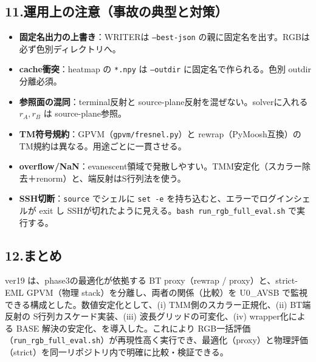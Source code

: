 \documentclass[a4paper,11pt]{jsarticle} %
\begin{document}
\subsection*{11.\;運用上の注意（事故の典型と対策）}
\begin{itemize}
\item \textbf{固定名出力の上書き}：WRITERは \texttt{--best-json} の親に固定名を出す。RGBは必ず色別ディレクトリへ。
\item \textbf{cache衝突}：heatmap の \texttt{*.npy} は \texttt{--outdir} に固定名で作られる。色別 outdir 分離必須。
\item \textbf{参照面の混同}：terminal反射と source-plane反射を混ぜない。solverに入れる $r_A,r_B$ は source-plane参照。
\item \textbf{TM符号規約}：GPVM（\texttt{gpvm/fresnel.py}）と rewrap（PyMoosh互換）のTM規約は異なる。用途ごとに一貫させる。
\item \textbf{overflow/NaN}：evanescent領域で発散しやすい。TMM安定化（スカラー除去＋renorm）と、端反射はS行列法を使う。
\item \textbf{SSH切断}：\texttt{source} でシェルに \texttt{set -e} を持ち込むと、エラーでログインシェルが exit し SSHが切れたように見える。\texttt{bash run\_rgb\_full\_eval.sh} で実行する。
\end{itemize}

\subsection*{12.\;まとめ}
ver19 は、phase3の最適化が依拠する BT proxy（rewrap / proxy）と、strict-EML GPVM（物理 stack）を分離し、両者の関係（比較）を U0\_AVSB で監視できる構成とした。数値安定化として、(i) TMM側のスカラー正規化、(ii) BT端反射の S行列カスケード実装、(iii) 波長グリッドの可変化、(iv) wrapper化による BASE 解決の安定化、を導入した。これにより RGB一括評価（\texttt{run\_rgb\_full\_eval.sh}）が再現性高く実行でき、最適化（proxy）と物理評価（strict）を同一リポジトリ内で明確に比較・検証できる。
\end{document}
